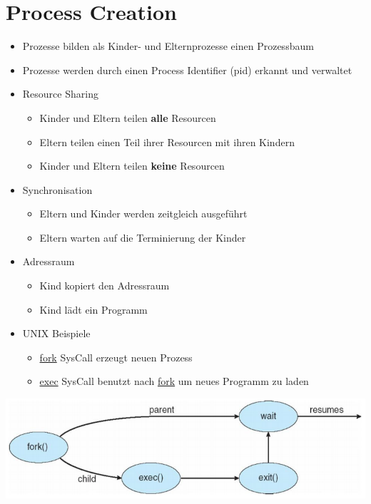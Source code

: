 \documentclass[a4paper]{scrreprt}
\begin{document}
\section{Process Creation}
	\begin{itemize}
		\item Prozesse bilden als Kinder- und Elternprozesse einen Prozessbaum
		\item Prozesse werden durch einen Process Identifier (pid) erkannt und verwaltet
		\item Resource Sharing
		\begin{itemize}
			\item Kinder und Eltern teilen \textbf{alle} Resourcen
			\item Eltern teilen einen Teil ihrer Resourcen mit ihren Kindern
			\item Kinder und Eltern teilen \textbf{keine} Resourcen
		\end{itemize}
		\item Synchronisation
		\begin{itemize}
			\item Eltern und Kinder werden zeitgleich ausgeführt
			\item Eltern warten auf die Terminierung der Kinder
		\end{itemize}
		\item Adressraum
		\begin{itemize}
			\item Kind kopiert den Adressraum
			\item Kind lädt ein Programm
		\end{itemize}
		\item UNIX Beispiele
		\begin{itemize}
			\item \underline{fork} SysCall erzeugt neuen Prozess
			\item \underline{exec} SysCall benutzt nach \underline{fork} um neues Programm zu laden
		\end{itemize}
	\end{itemize}
	\includegraphics[scale = 0.6]{graphics/process_fork.png}
\end{document}
